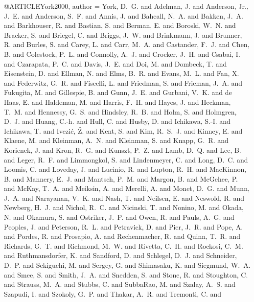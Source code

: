 \documentclass[useAMS,usenatbib]{mnras}
\begin{document}
{{{{{{{{{{{{{{{{{{{{{{{{{{{@ARTICLE{York2000,
   author = {{York}, D.~G. and {Adelman}, J. and {Anderson}, Jr., J.~E. and 
	{Anderson}, S.~F. and {Annis}, J. and {Bahcall}, N.~A. and {Bakken}, J.~A. and 
	{Barkhouser}, R. and {Bastian}, S. and {Berman}, E. and {Boroski}, W.~N. and 
	{Bracker}, S. and {Briegel}, C. and {Briggs}, J.~W. and {Brinkmann}, J. and 
	{Brunner}, R. and {Burles}, S. and {Carey}, L. and {Carr}, M.~A. and 
	{Castander}, F.~J. and {Chen}, B. and {Colestock}, P.~L. and 
	{Connolly}, A.~J. and {Crocker}, J.~H. and {Csabai}, I. and 
	{Czarapata}, P.~C. and {Davis}, J.~E. and {Doi}, M. and {Dombeck}, T. and 
	{Eisenstein}, D. and {Ellman}, N. and {Elms}, B.~R. and {Evans}, M.~L. and 
	{Fan}, X. and {Federwitz}, G.~R. and {Fiscelli}, L. and {Friedman}, S. and 
	{Frieman}, J.~A. and {Fukugita}, M. and {Gillespie}, B. and 
	{Gunn}, J.~E. and {Gurbani}, V.~K. and {de Haas}, E. and {Haldeman}, M. and 
	{Harris}, F.~H. and {Hayes}, J. and {Heckman}, T.~M. and {Hennessy}, G.~S. and 
	{Hindsley}, R.~B. and {Holm}, S. and {Holmgren}, D.~J. and {Huang}, C.-h. and 
	{Hull}, C. and {Husby}, D. and {Ichikawa}, S.-I. and {Ichikawa}, T. and 
	{Ivezi{\'c}}, {\v Z}. and {Kent}, S. and {Kim}, R.~S.~J. and 
	{Kinney}, E. and {Klaene}, M. and {Kleinman}, A.~N. and {Kleinman}, S. and 
	{Knapp}, G.~R. and {Korienek}, J. and {Kron}, R.~G. and {Kunszt}, P.~Z. and 
	{Lamb}, D.~Q. and {Lee}, B. and {Leger}, R.~F. and {Limmongkol}, S. and 
	{Lindenmeyer}, C. and {Long}, D.~C. and {Loomis}, C. and {Loveday}, J. and 
	{Lucinio}, R. and {Lupton}, R.~H. and {MacKinnon}, B. and {Mannery}, E.~J. and 
	{Mantsch}, P.~M. and {Margon}, B. and {McGehee}, P. and {McKay}, T.~A. and 
	{Meiksin}, A. and {Merelli}, A. and {Monet}, D.~G. and {Munn}, J.~A. and 
	{Narayanan}, V.~K. and {Nash}, T. and {Neilsen}, E. and {Neswold}, R. and 
	{Newberg}, H.~J. and {Nichol}, R.~C. and {Nicinski}, T. and 
	{Nonino}, M. and {Okada}, N. and {Okamura}, S. and {Ostriker}, J.~P. and 
	{Owen}, R. and {Pauls}, A.~G. and {Peoples}, J. and {Peterson}, R.~L. and 
	{Petravick}, D. and {Pier}, J.~R. and {Pope}, A. and {Pordes}, R. and 
	{Prosapio}, A. and {Rechenmacher}, R. and {Quinn}, T.~R. and 
	{Richards}, G.~T. and {Richmond}, M.~W. and {Rivetta}, C.~H. and 
	{Rockosi}, C.~M. and {Ruthmansdorfer}, K. and {Sandford}, D. and 
	{Schlegel}, D.~J. and {Schneider}, D.~P. and {Sekiguchi}, M. and 
	{Sergey}, G. and {Shimasaku}, K. and {Siegmund}, W.~A. and {Smee}, S. and 
	{Smith}, J.~A. and {Snedden}, S. and {Stone}, R. and {Stoughton}, C. and 
	{Strauss}, M.~A. and {Stubbs}, C. and {SubbaRao}, M. and {Szalay}, A.~S. and 
	{Szapudi}, I. and {Szokoly}, G.~P. and {Thakar}, A.~R. and {Tremonti}, C. and 
}}}}}}}}}}}}}}}}}}}}}}}}}}}}}
\end{document}
